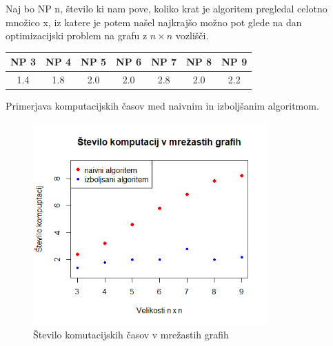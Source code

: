 \documentclass[a4paper, 12 pt]{article}
\theoremstyle{definition} %
\theoremstyle{plain} %
\theoremstyle{definition}
\begin{document}
\bigskip
Naj bo NP n, število ki nam pove, koliko krat je algoritem pregledal celotno množico x, iz katere je potem našel najkrajšo možno pot glede na dan optimizacijski problem na grafu z $n \times n$ vozlišči.
\begin{center}
 \begin{tabular}{||c c c c c c c||} 
 \hline
 NP 3 &  NP 4 &  NP 5 &  NP 6 &  NP 7 &  NP 8 &  NP 9 \\ 
 \hline
\hline
1.4& 1.8& 2.0& 2.0& 2.8& 2.0& 2.2\\ 
 \hline
\end{tabular}
\end{center}

Primerjava komputacijskih časov med naivnim in izboljšanim algoritmom.
\begin{figure}[H]
  \centering
  \includegraphics[width=90mm]{rplot.png}
  \caption{Število komutacijskih časov v mrežastih grafih}
  \label{fig: Graf 1}
\end{figure}
\end{document}
